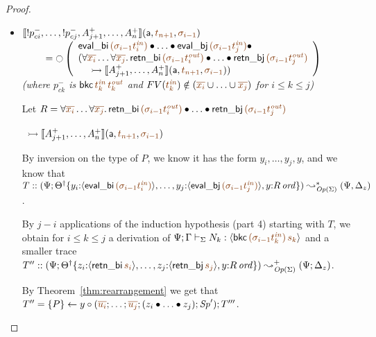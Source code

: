 \begin{proof}
\begin{itemize}
\item $\opbasic{{!}p^-_{ci},\ldots,{!}p^-_{cj},A^+_{j+1},\ldots,A^+_n}{t_{n+1}}{\sigma_{i-1}}$
  \\
  $~ \qquad = {\ocircle}\left(
    \begin{array}{l}
       {\sf eval\_bi}\,\lf{({\sigma_{i-1}}t^{\it in}_i)} 
                    \fuse  \ldots \fuse
                 {\sf eval\_bj}\,\lf{({\sigma_{i-1}}t^{\it in}_j)} \fuse ~
       \\
       (\forall\lf{\overline{x_i}}\ldots\forall\lf{\overline{x_j}}.\, 
          {\sf retn\_bi}\,\lf{(\sigma_{i-1}{t^{\it out}_i})}
          \fuse \ldots \fuse 
       {\sf retn\_bj}\,\lf{(\sigma_{i-1}{t^{\it out}_j})}
       \\
       ~\quad
       \lefti \opbasic{A^+_{j+1},\ldots,A^+_n}{t_{n+1}}{\sigma_{i-1}})
    \end{array} \right)$\\
  {\it (where
   $p^-_{ck}$ is ${\sf bkc}\,\lf{t^{\it in}_k}\,\lf{t^{\it out}_k}$ 
   and $FV(\lf{t_k^{\it in}}) \notin (\lf{\overline{x_i}} \cup \ldots \cup \lf{\overline{x_j}})$ 
   for $i \leq k \leq j$)}

  \bigskip
  Let $R = \forall\lf{\overline{x_i}}\ldots\forall\lf{\overline{x_j}}.\, 
     {\sf retn\_bi}\,\lf{(\sigma_{i-1}{t^{\it out}_i})}
     \fuse \ldots \fuse 
     {\sf retn\_bj}\,\lf{(\sigma_{i-1}{t^{\it out}_j})}$

   ~\qquad\qquad\qquad\qquad\quad $\lefti \opbasic{A^+_{j+1},\ldots,A^+_n}{t_{n+1}}{\sigma_{i-1}}$

  \smallskip
  By inversion on the type of $P$, we know it has the form 
  $y_i, \ldots, y_j, y$, and we know that
  $T :: (\Psi; \tackon{\opsubst{\Theta}}
     {y_i{:}\susp{{\sf eval\_bi}\,\lf{({\sigma_{i-1}}t^{\it in}_i)}}, \ldots,
      y_j{:}\susp{{\sf eval\_bj}\,\lf{({\sigma_{i-1}}t^{\it in}_j)}},
      y{:}\istrue{R}})
    \leadsto^*_{\transop{\Sigma}} (\Psi, \Delta_z)$. 

  \smallskip
  By $j - i$ applications of the induction hypothesis
  (part 4) starting with $T$, we obtain for $i \leq k \leq j$
  a derivation of 
  $\slst{\Sigma}{\Psi}{\Gamma}{N_k}{\susp{{\sf bkc}\,\lf{(\sigma_{i-1} t^{\it in}_k)\,\lf{s_k}}}}$
  and a smaller trace 
  $T'' :: (\Psi; \tackon{\opsubst{\Theta}}
     {z_i{:}\susp{{\sf retn\_bi}\,\lf{s_i}}, \ldots,
      z_j{:}\susp{{\sf retn\_bj}\,\lf{s_j}},
      y{:}\istrue{R}})
    \leadsto^+_{\transop{\Sigma}}
    (\Psi; \Delta_z)$.

  \smallskip
  By Theorem~\ref{thm:rearrangement}
  we get that 
  $T'' = \tstep{P}{y}
            {(\lf{\overline{u_i}}; \ldots; \lf{\overline{u_j}};
             (\tfuser{z_i}{\tfuser{\ldots}{z_j}}); \Sp')}; T'''$.


\end{itemize}
\end{proof}
